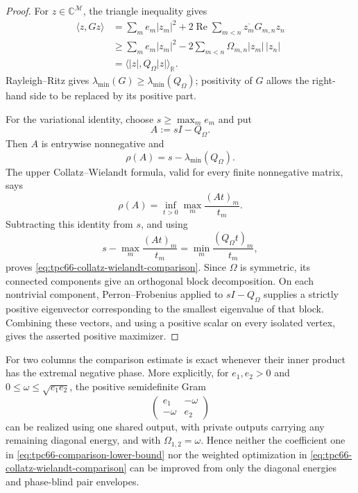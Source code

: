 \begin{proof}
For \(z\in\mathbb C^{\mathcal M}\), the triangle inequality gives
\begin{align*}
 \langle z,Gz\rangle
 &=
 \sum_m e_m|z_m|^2
 +2\operatorname{Re}\sum_{m<n}
   \overline{z_m}G_{m,n}z_n\\
 &\ge
 \sum_m e_m|z_m|^2
 -2\sum_{m<n}\Omega_{m,n}|z_m|\,|z_n|\\
 &=\langle |z|,Q_\Omega|z|\rangle_{\mathbb R}.
\end{align*}
Rayleigh--Ritz gives
\(\lambda_{\min}(G)\ge\lambda_{\min}(Q_\Omega)\); positivity of \(G\)
allows the right-hand side to be replaced by its positive part.

For the variational identity, choose
\(s\ge\max_m e_m\) and put
\[
 A:=sI-Q_\Omega.
\]
Then \(A\) is entrywise nonnegative and
\[
 \rho(A)=s-\lambda_{\min}(Q_\Omega).
\]
The upper Collatz--Wielandt formula, valid for every finite nonnegative
matrix, says
\[
 \rho(A)
 =
 \inf_{t>0}\max_m\frac{(At)_m}{t_m}.
\]
Subtracting this identity from \(s\), and using
\[
 s-\max_m\frac{(At)_m}{t_m}
 =
 \min_m\frac{(Q_\Omega t)_m}{t_m},
\]
proves \eqref{eq:tpc66-collatz-wielandt-comparison}.
Since \(\Omega\) is symmetric, its connected components give an orthogonal
block decomposition.  On each nontrivial component, Perron--Frobenius
applied to \(sI-Q_\Omega\) supplies a strictly positive eigenvector
corresponding to the smallest eigenvalue of that block.  Combining these
vectors, and using a positive scalar on every isolated vertex, gives the
asserted positive maximizer.
\end{proof}

\begin{remark}
\label{rem:tpc66-comparison-sharpness}
For two columns the comparison estimate is exact whenever their inner
product has the extremal negative phase.  More explicitly, for
\(e_1,e_2>0\) and
\(0\le\omega\le\sqrt{e_1e_2}\), the positive semidefinite Gram
\[
 \begin{pmatrix}
 e_1&-\omega\\
 -\omega&e_2
 \end{pmatrix}
\]
can be realized using one shared output, with private outputs carrying any
remaining diagonal energy, and with \(\Omega_{1,2}=\omega\).  Hence neither
the coefficient one in
\eqref{eq:tpc66-comparison-lower-bound} nor the weighted optimization in
\eqref{eq:tpc66-collatz-wielandt-comparison} can be improved from only the
diagonal energies and phase-blind pair envelopes.
\end{remark}


